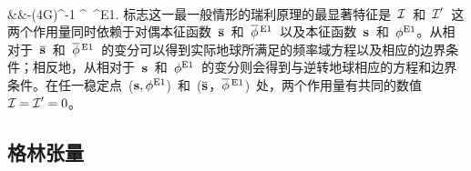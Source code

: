 \nonumber \\
&&\mbox{}\qquad\qquad-(4\pi G)^{-1}
\bdel\overline{\phi}^{\,}
\cdot\bdel\phi^{\rm E1}.
\ena
标志这一最一般情形的瑞利原理的最显著特征是~$\mbox{$\cal I$}$~和~$\mbox{$\cal I$}'$~这两个作用量同时依赖于对偶本征函数~$\overline{\mbox{${\bf s}$}}$~和~$\overline{\phi}^{\,\raisebox{-.7ex}{\scriptsize{E1}}}$~以及本征函数~$\mbox{${\bf s}$}$~和~$\phi^{\rm E1}$。从相对于~$\overline{\mbox{${\bf s}$}}$~和~$\overline{\phi}^{\,\raisebox{-.7ex}{\scriptsize{E1}}}$~的变分可以得到实际地球所满足的频率域方程以及相应的边界条件；相反地，从相对于~$\mbox{${\bf s}$}$~和~$\phi^{\rm E1}$~的变分则会得到与逆转地球相应的方程和边界条件。在任一稳定点~($\mbox{${\bf s}$},\phi^{\rm E1}$)~和~($\overline{\mbox{${\bf s}$}}$，$\overline{\phi}^{\,\raisebox{-.7ex}{\scriptsize{E1}}}$)~处，两个作用量有共同的数值~$\mbox{$\cal I$}=\mbox{$\cal I$}'=0$。
%

\renewcommand{\thesubsection}{$\!\!\!\raise1.3ex\hbox{$\star$}\!\!$
\arabic{chapter}.\arabic{section}.\arabic{subsection}}
\subsection{格林张量}
%
%
\label{6.sec.rotGreen}
\renewcommand{\thesubsection}{\arabic{chapter}.\arabic{section}.\arabic{subsection}}

